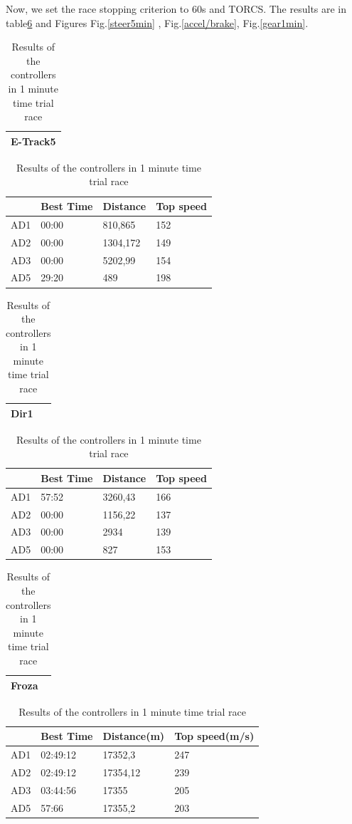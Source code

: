 \documentclass{llncs}
\begin{document}
Now, we set the race stopping criterion to 60s and TORCS. The results are in table\ref{resulta2} and Figures Fig.\ref{steer5min} , Fig.\ref{accel/brake}, Fig.\ref{gear1min}.

\begin{table} [h!] 
	
	\caption{Results of the controllers in 1 minute time trial race}
	\label{resulta2}
	\begin{tabular}{ |p{}|}
		\hline
		\textbf{E-Track5}   
		\\
		\hline
	\end{tabular}
	\begin{tabular}{ ||p{3cm}||p{3cm}||p{3cm}||p{3 cm}||}
		\hline
		{ \color{blue}\textbf{} }&
		{ \color{red}\textbf{Best Time} }&
		{ \color{red} \textbf{Distance } } &
		{ \color{red} \textbf{Top speed} }
		\\
		\hline
		AD1 &00:00  &810,865& 152 
		\\
		\hline
		AD2 & 00:00 &1304,172& 149
		\\
		\hline
		AD3 &00:00 & 5202,99& 154 
		\\
		\hline 
		AD5 & 29:20 &	489  & 198
		\\
		\hline 
		
	\end{tabular}
	\begin{tabular}{ |p{}|}
		\hline
		\textbf{Dir1}   
		\\
		\hline
	\end{tabular}
	\begin{tabular}{ ||p{3cm}||p{3cm}||p{3cm}||p{3 cm}||}
		\hline
		{ \color{blue}\textbf{} }&
		{ \color{red}\textbf{Best Time} }&
		{ \color{red} \textbf{Distance } } &
		{ \color{red} \textbf{Top speed} }
		\\
		\hline
		AD1 & 57:52 & 3260,43&  166
		\\
		\hline
		AD2 & 00:00 & 1156,22
		& 137
		\\
		\hline
		AD3 & 00:00 & 2934& 139
		\\
		\hline 
		AD5 & 00:00 &	827 & 153
		\\
		\hline 
		
	\end{tabular}
	\begin{tabular}{ |p{}|}
		\hline
		\textbf{Froza}   
		\\
		\hline
	\end{tabular}
	\begin{tabular}{ ||p{3cm}||p{3cm}||p{3cm}||p{3 cm}||}
		\hline
		{ \color{blue}\textbf{} }&
		{ \color{red}\textbf{Best Time} }&
		{ \color{red} \textbf{Distance(m) } } &
		{ \color{red} \textbf{Top speed(m/s)} }
		\\
		\hline
		AD1 & 02:49:12  &17352,3  &  247
		\\
		\hline
		AD2 & 02:49:12  & 17354,12 & 239
		\\
		\hline
		AD3 & 03:44:56 & 17355 & 205 
		\\
		\hline 
		AD5 & 57:66 & 17355,2 & 203 
		\\
		\hline 
		

\end{tabular}
\end{table}
\end{document}
